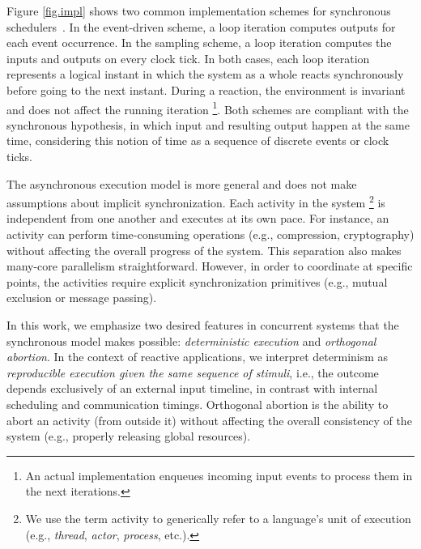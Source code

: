 \documentclass{acm_proc_article-sp}
\newcommand{\1}{\;}
\newcommand{\2}{\;\;}
\newcommand{\3}{\;\;\;}
\newcommand{\5}{\;\;\;\;\;}
\begin{document}
Figure \ref{fig.impl} shows two common implementation schemes for synchronous 
schedulers~\cite{rp.twelve}.
%
In the event-driven scheme, a loop iteration computes outputs for each event 
occurrence.
%
In the sampling scheme, a loop iteration computes the inputs and outputs on 
every clock tick.
%
In both cases, each loop iteration represents a logical instant in which the 
system as a whole reacts synchronously before going to the next instant.
%
During a reaction, the environment is invariant and does not affect the running 
iteration%
\footnote{
An actual implementation enqueues incoming input events to process them in the 
next iterations.
}.
%
Both schemes are compliant with the synchronous hypothesis, in which input and 
resulting output happen at the same time, considering this notion of time as a 
sequence of discrete events or clock ticks.

The asynchronous execution model is more general and does not make assumptions 
about implicit synchronization.
Each activity in the system%
\footnote{We use the term activity to generically refer to a language's unit of 
execution (e.g., \emph{thread}, \emph{actor}, \emph{process}, etc.).}
is independent from one another and executes at its own pace.
%
For instance, an activity can perform time-consuming operations (e.g., 
compression, cryptography) without affecting the overall progress of the 
system.
%
This separation also makes many-core parallelism straightforward.
%
However, in order to coordinate at specific points, the activities require 
explicit synchronization primitives (e.g., mutual exclusion or message 
passing).


In this work, we emphasize two desired features in concurrent systems that the 
synchronous model makes possible: \emph{deterministic execution} and 
\emph{orthogonal abortion}.
%
In the context of reactive applications, we interpret determinism as 
\emph{reproducible execution given the same sequence of stimuli}, i.e., the 
outcome depends exclusively of an external input timeline, in contrast with 
internal scheduling and communication timings.
%
Orthogonal abortion is the ability to abort an activity (from outside it) 
without affecting the overall consistency of the system (e.g., properly 
releasing global resources).
\end{document}
